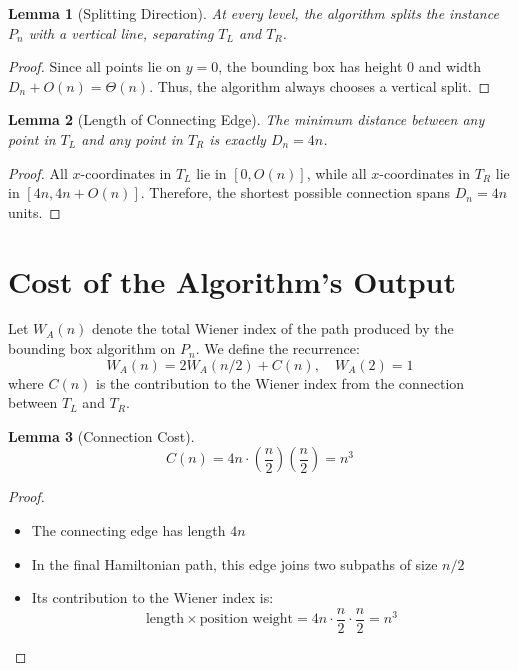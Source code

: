 \documentclass{article}
\newtheorem{lemma}{Lemma}
\begin{document}
\begin{lemma}[Splitting Direction]
At every level, the algorithm splits the instance $P_n$ with a vertical line, separating $T_L$ and $T_R$.
\end{lemma}

\begin{proof}
Since all points lie on $y = 0$, the bounding box has height $0$ and width $D_n + O(n) = \Theta(n)$. Thus, the algorithm always chooses a vertical split.
\end{proof}

\begin{lemma}[Length of Connecting Edge]
The minimum distance between any point in $T_L$ and any point in $T_R$ is exactly $D_n = 4n$.
\end{lemma}

\begin{proof}
All $x$-coordinates in $T_L$ lie in $[0, O(n)]$, while all $x$-coordinates in $T_R$ lie in $[4n, 4n + O(n)]$. Therefore, the shortest possible connection spans $D_n = 4n$ units.
\end{proof}

\section{Cost of the Algorithm's Output}

Let $W_A(n)$ denote the total Wiener index of the path produced by the bounding box algorithm on $P_n$. We define the recurrence:
\[
    W_A(n) = 2W_A(n/2) + C(n), \quad W_A(2) = 1
\]
where $C(n)$ is the contribution to the Wiener index from the connection between $T_L$ and $T_R$.

\begin{lemma}[Connection Cost]
\[
    C(n) = 4n \cdot \left(\frac{n}{2}\right)\left(\frac{n}{2}\right) = n^3
\]
\end{lemma}

\begin{proof}
\begin{itemize}
    \item The connecting edge has length $4n$
    \item In the final Hamiltonian path, this edge joins two subpaths of size $n/2$
    \item Its contribution to the Wiener index is:
    \[
        \text{length} \times \text{position weight} = 4n \cdot \frac{n}{2} \cdot \frac{n}{2} = n^3
    \]
\end{itemize}
\end{proof}
\end{document}
